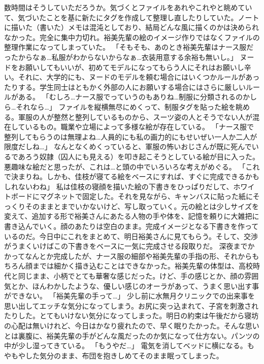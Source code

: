 数時間はそうしていただろうか。気づくとファイルをあれやこれやと眺めていて、気づいたことを基に新たにタグを作成して整理し直したりしていた。ノートに描いた（書いた）メモは混沌としており、結局どんな風に描くのかは決められなかった。完全に集中力切れ。裕美先輩の絵のイメージ作りではなくファイルの整理作業になってしまっていた。
「そもそも、あのとき裕美先輩はナース服だったからなぁ…私服がわからないからなぁ…衣装用意する余裕も無いし。」
ヌードをお願いしてもいいが、初めてモデルになってもらう人にそれはお願いし辛い。それに、大学的にも、ヌードのモデルを頼む場合にはいくつかルールがあったりする。学生同士はともかく外部の人にお願いする場合にはさらに厳しいルールがある。
「むしろ…ナース服でっていうのもありね…制服に分類されるのかしら…それなら…」
ファイルを縦横無尽にめくって、制服タグを貼った絵を眺める。軍服の人が整然と整列しているものから、スーツ姿の人とそうでない人が混在しているもの。職業や立場によって多様な絵が存在している。
「ナース服で整列してもらうのは無理よね…人員的にも私の画力的にもせいぜい一人か二人が限度だしね…」
なんとなくめくっていると、軍服の怖いおじさんが既に死んでいるであろう奴隷（囚人にも見える）を叩き起こそうとしている絵が目に入った。悪趣味な絵だと思ったが、これは…と頭の中でいろいろな考えがめぐる。
「これで決まりね。しかも、佳枝が寝てる絵をベースにすれば、すぐに完成できるかもしれないわね」
私は佳枝の寝顔を描いた絵の下書きをひっぱりだして、ホワイトボードにマグネットで固定した。それを見ながら、キャンバスに貼った紙にそっくりそのままとまでいかないけど、写し取っていく。元の絵とは少しサイズを変えて、追加する形で裕美さんにあたる人物の手や体を、記憶を頼りに大雑把に書き込んでいく。顔のあたりは空白のまま。完成イメージとなる下書きを作っているのだ。今日中にこれをまとめて、明日裕美さんに見てもらう。そして、交渉がうまくいけばこの下書きをベースに一気に完成させる段取りだ。
深夜までかかってなんとか完成したが、ナース服の細部や裕美先輩の手指の形、それからもちろん顔までは細かく描き込むことはできなかった。裕美先輩の体型は、高校時代と同じまま、小柄でとても華奢な感じだった。けど、手の感じとか、顔の雰囲気とか、ほんわかしたような、優しい感じのオーラがあって、うまく思い出す事ができない。
「裕美先輩の手って…」
少し前に水無月クリニックでの出来事を思い出してエッチな気分になってしまう。お尻に突っ込まれて、子宮を刺激されたりした。とてもいけない気分になってしまった。明日の約束は午後だから寝坊の心配は無いけれど、今日はかなり疲れたので、早く眠りたかった。そんな思いとは裏腹に、裕美先輩の手がどんな風だったのか気になって仕方ない。パンツの中が少し湿ってきている。
「もうやだ…」
電気を消してベッドに横になる。もやもやした気分のまま、布団を抱きしめてそのまま眠ってしまった。

